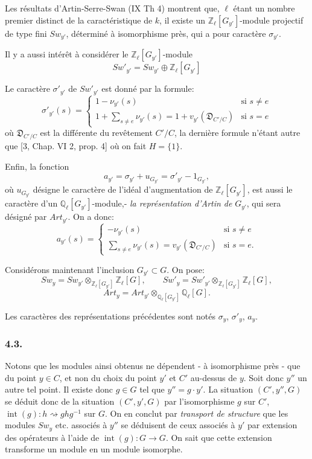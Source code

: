 Les résultats d'Artin-Serre-Swan (IX Th 4) montrent que, $\ell$ étant un nombre premier distinct de la caractéristique de $k$, il existe un $\mathbb{Z}_\ell[G_{y'}]$-module projectif de type fini $Sw_{y'}$, déterminé à isomorphisme près, qui a pour caractère $\sigma_{y'}$.

Il y a aussi intérêt à considérer le $\mathbb{Z}_\ell[G_{y'}]$-module
\[
Sw'_{y'}=Sw_{y'}\oplus\mathbb{Z}_\ell[G_{y'}]
\tag{4.2.3}
\]

Le caractère $\sigma'_{y'}$ de $Sw'_{y'}$ est donné par la formule:
\[
\sigma'_{y'}(s)=
\begin{cases}
1-\nu_{y'}(s)& \text{si } s\ne e\\[0.4em]
\displaystyle 1+\sum_{s\ne e}\nu_{y'}(s)
=1+v_{y'}(\mathfrak{D}_{C'/C})& \text{si } s=e
\end{cases}
\tag{4.2.4}
\]
où $\mathfrak{D}_{C'/C}$ est la différente du
revêtement $C'/C$, la dernière formule n'étant autre que [3, Chap. VI 2, prop. 4] où on fait $H=\{1\}$.

Enfin, la fonction
\[
a_{y'}=\sigma_{y'}+u_{G_{y'}}=\sigma'_{y'}-1_{G_{y'}},
\tag{4.2.5}
\]
où $u_{G_{y'}}$ désigne le caractère de l'idéal d'augmentation de $\mathbb{Z}_\ell[G_{y'}]$, est aussi le caractère d'un $\mathbb{Q}_\ell[G_{y'}]$-module,- \emph{la représentation d'Artin de} $G_{y'}$, qui sera désigné par $Art_{y'}$.
On a donc:
\[
a_{y'}(s)=
\begin{cases}
-\nu_{y'}(s)& \text{si } s\ne e\\[0.4em]
\displaystyle\sum_{s\ne e}\nu_{y'}(s)=v_{y'}(\mathfrak{D}_{C'/C})& \text{si } s=e.
\end{cases}
\tag{4.2.6}
\]

Considérons maintenant l'inclusion $G_{y'}\subset G$. On pose:
\[
Sw_y=Sw_{y'}\otimes_{\mathbb{Z}_\ell[G_{y'}]}\mathbb{Z}_\ell[G],
\qquad
Sw'_y=Sw'_{y'}\otimes_{\mathbb{Z}_\ell[G_{y'}]}\mathbb{Z}_\ell[G],
\tag{4.2.7}
\]
\[
Art_y=Art_{y'}\otimes_{\mathbb{Q}_\ell[G_{y'}]}\mathbb{Q}_\ell[G].
\tag{4.2.8}
\]

Les caractères des représentations précédentes sont notés $\sigma_y$, $\sigma'_y$, $a_y$.

\subsubsection*{4.3.}

Notons que les modules ainsi obtenus ne dépendent - à isomorphisme près - que du point $y\in C$, et non du choix du point $y'$ et $C'$ au-dessus de $y$. Soit donc $y''$ un autre tel point. Il existe donc $g\in G$ tel que $y''=g\cdot y'$. La situation $(C',y'',G)$ se déduit donc de la situation $(C',y',G)$ par l'isomorphisme $g$ sur $C'$, $\operatorname{int}(g):h\rightsquigarrow ghg^{-1}$ sur $G$. On en conclut par \emph{transport de structure} que les modules $Sw_y$ etc. associés à $y''$ se déduisent de ceux associés à $y'$ par extension des opérateurs à l'aide de $\operatorname{int}(g):G\to G$. On sait que cette extension transforme un module en un module isomorphe.

